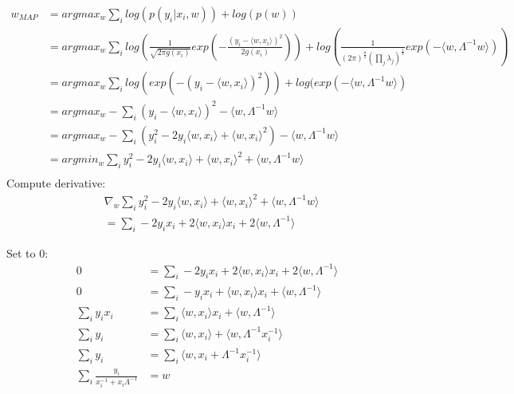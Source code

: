 \documentclass[a4paper]{scrartcl}
\begin{document}
    \begin{align*}
      w_{MAP}
      &= argmax_w \sum_i log(p(y_i \vert x_i, w)) + log(p(w))\\
      &= argmax_w \sum_i log(\frac{1}{\sqrt{2 \pi g(x_i)}} exp(-\frac{(y_i-\langle w, x_i \rangle )^2}{2g(x_i)})) + log(\frac{1}{(2\pi)^\frac{d}{2} (\prod_j \lambda_j)^\frac{1}{2}} exp(- \langle w, \Lambda^{-1}w \rangle))\\
      &= argmax_w \sum_i log(exp(-(y_i-\langle w, x_i \rangle )^2)) + log(exp(- \langle w, \Lambda^{-1}w \rangle)\\
      &= argmax_w - \sum_i(y_i-\langle w, x_i \rangle )^2 - \langle w, \Lambda^{-1}w \rangle\\
      &= argmax_w - \sum_i (y_i^2 -2y_i \langle w, x_i \rangle + \langle w, x_i \rangle^2) - \langle w, \Lambda^{-1}w \rangle\\
      &= argmin_w  \sum_i y_i^2 -2y_i \langle w, x_i \rangle + \langle w, x_i \rangle^2 + \langle w, \Lambda^{-1}w \rangle\\
    \end{align*}
    Compute derivative:
    \begin{align*}
      & \nabla_w \sum_i y_i^2 -2y_i \langle w, x_i \rangle + \langle w, x_i \rangle^2 + \langle w, \Lambda^{-1}w \rangle\\
      &= \sum_i -2y_i x_i + 2 \langle w,  x_i \rangle x_i + 2 \langle w, \Lambda^{-1} \rangle
    \end{align*}

    Set to 0:
    \begin{align*}
      0 &= \sum_i -2y_i x_i + 2 \langle w,  x_i \rangle x_i + 2 \langle w, \Lambda^{-1} \rangle\\
      0 &= \sum_i -y_i x_i + \langle w,  x_i \rangle x_i + \langle w, \Lambda^{-1} \rangle\\
      \sum_i y_i x_i &= \sum_i  \langle w,  x_i \rangle x_i + \langle w,  \Lambda^{-1} \rangle\\
      \sum_i y_i &= \sum_i  \langle w,  x_i \rangle + \langle w,  \Lambda^{-1} x_i^{-1}\rangle\\
      \sum_i y_i &= \sum_i  \langle w,  x_i + \Lambda^{-1} x_i^{-1}\rangle\\
      \sum_i \frac{y_i}{x_i^{-1}+x_i \Lambda^{-1}} &= w
    \end{align*}
\end{document}
